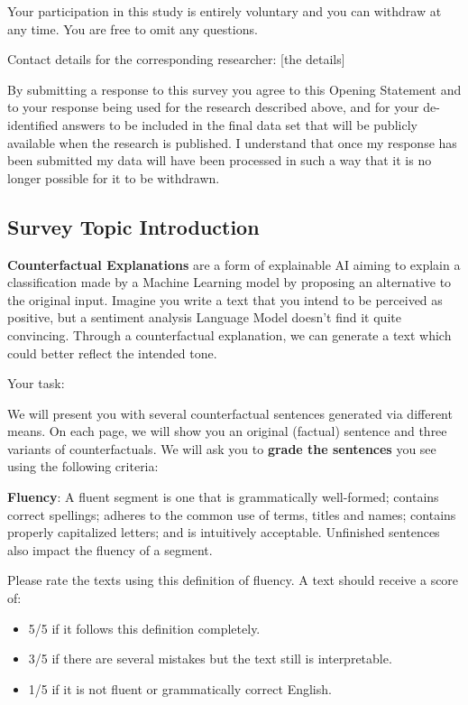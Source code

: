\documentclass[11pt]{article}
\begin{document}
Your participation in this study is entirely voluntary and you can withdraw at any time. You are free to omit any questions.  

Contact details for the corresponding researcher: [the details]

By submitting a response to this survey you agree to this Opening Statement and to your response being used for the research described above, and for your de-identified answers to be included in the final data set that will be publicly available when the research is published. I understand that once my response has been submitted my data will have been processed in such a way that it is no longer possible for it to be withdrawn.

\subsection{Survey Topic Introduction}\label{appendix:topic_introduction}

\textbf{Counterfactual Explanations} are a form of explainable AI aiming to explain a classification made by a Machine Learning model by proposing an alternative to the original input. Imagine you write a text that you intend to be perceived as positive, but a sentiment analysis Language Model doesn't find it quite convincing. Through a counterfactual explanation, we can generate a text which could better reflect the intended tone.

Your task:

We will present you with several counterfactual sentences generated via different means. On each page, we will show you an original (factual) sentence and three variants of counterfactuals. We will ask you to \textbf{grade the sentences} you see using the following criteria:

\textbf{Fluency}: A fluent segment is one that is grammatically well-formed; contains correct spellings; adheres to the common use of terms, titles and names; contains properly capitalized letters; and is intuitively acceptable. Unfinished sentences also impact the fluency of a segment.

Please rate the texts using this definition of fluency. A text should receive a score of:
\begin{itemize}
    \item 5/5 if it follows this definition completely.
    \item 3/5 if there are several mistakes but the text still is interpretable.
    \item 1/5 if it is not fluent or grammatically correct English.
\end{itemize}
\end{document}
